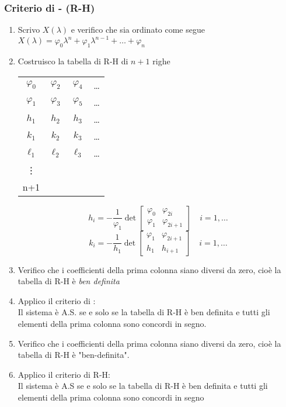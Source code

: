 	\subsubsection{Criterio di - (R-H)}
	\begin{enumerate}
		\item Scrivo $ X(\lambda) $ e verifico che sia ordinato come segue\\
		$ X(\lambda) = \varphi_0\lambda^n + \varphi_1\lambda^{n-1} + \dots + \varphi_n $
		\item Costruisco la tabella di R-H di $ n+1 $ righe\\
		\begin{table}[H]
			\centering
			\begin{tabular}{c c c c}
				$\varphi_0$ & $\varphi_2$ & $\varphi_4$ & \dots \\
				$\varphi_1$ & $\varphi_3$ & $\varphi_5$ & \dots \\
				$ h_1 $   & $ h_2 $     & $ h_3 $     & \dots \\
				$ k_1 $   & $ k_2 $     & $ k_3 $     & \dots \\
				$ \ell_1 $  & $ \ell_2 $  & $ \ell_3 $  & \dots \\
				\vdots    &             &             &       \\
				n+1   &             &             &
			\end{tabular}
		\end{table}
		\[ h_i = -\frac{1}{\varphi_1} \det\left[\begin{matrix}
			\varphi_0 & \varphi_{2i}\\
			\varphi_1 & \varphi_{2i +1}
		\end{matrix}\right]  \quad i = 1,\dots\]
		\[ k_i = -\frac{1}{h_1} \det\left[\begin{matrix}
			\varphi_1 & \varphi_{2i+1}\\
			h_1 & h_{i +1}
		\end{matrix}\right]  \quad i = 1,\dots\]
		\item Verifico che i coefficienti della prima colonna siano diversi da zero, cioè la tabella di R-H è \emph{ben definita}
		\item Applico il criterio di :\\
		Il sistema è A.S. se e solo se la tabella di R-H è ben definita e tutti gli elementi della prima colonna sono concordi in segno.
		\item Verifico che i coefficienti della prima colonna siano diversi da zero, cioè la tabella di R-H è "ben-definita".
		\item Applico il criterio di R-H:\\
		Il sistema è A.S se e solo se la tabella di R-H è ben definita e tutti gli elementi della prima colonna sono concordi in segno
	\end{enumerate}



